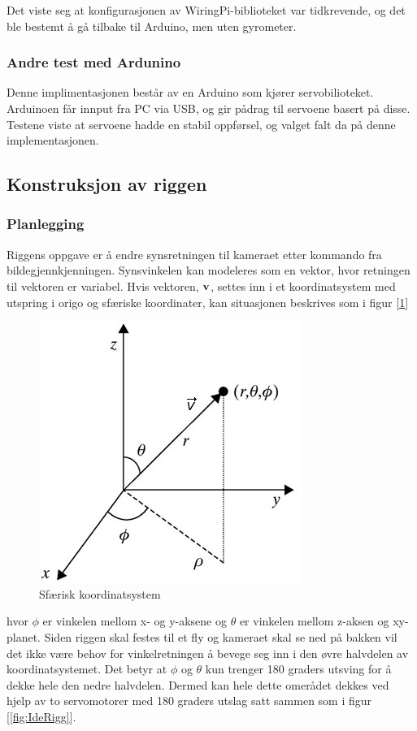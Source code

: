 Det viste seg at konfigurasjonen av WiringPi-biblioteket var tidkrevende, og det ble bestemt å gå tilbake til Arduino, men uten gyrometer.  

\subsubsection{Andre test med Ardunino}
Denne implimentasjonen består av en Arduino som kjører servobilioteket. Arduinoen får innput fra PC via USB, og gir pådrag til servoene basert på disse. Testene viste at servoene hadde en stabil oppførsel, og valget falt da på denne implementasjonen.   

\subsection{Konstruksjon av riggen}

\subsubsection{Planlegging}
Riggens oppgave er å endre synsretningen til kameraet etter kommando fra bildegjennkjenningen. Synsvinkelen kan modeleres som en vektor, hvor retningen til vektoren er variabel. Hvis vektoren, $\bf{v}$, settes inn i et koordinatsystem med utspring i origo og sfæriske koordinater, kan situasjonen beskrives som i figur [\ref{fig:spher}]

\begin{figure}[h!]
	\centering
	\includegraphics[scale=0.5]{img/RettVek.jpg}
	\caption{Sfærisk koordinatsystem}
	\label{fig:spher}
\end{figure}

hvor $\phi$ er vinkelen mellom x- og y-aksene og $\theta$ er vinkelen mellom z-aksen og xy-planet. Siden riggen skal festes til et fly og kameraet skal se ned på bakken vil det ikke være behov for vinkelretningen å bevege seg inn i den øvre halvdelen av koordinatsystemet. Det betyr at $\phi$ og $\theta$ kun trenger 180 graders utsving for å dekke hele den nedre halvdelen. Dermed kan hele dette omerådet dekkes ved hjelp av to servomotorer med 180 graders utslag satt sammen som i figur [\ref{fig:IdeRigg}]. 

